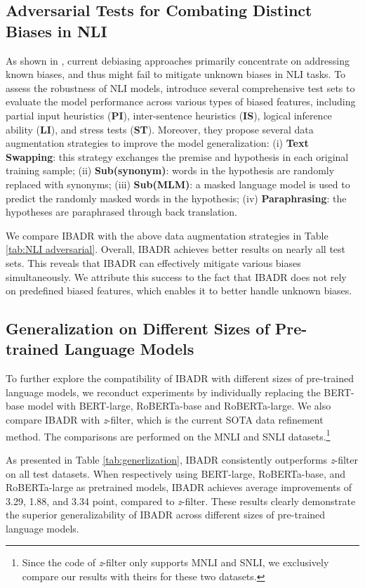 \documentclass[11pt]{article}
\def\model{\textsc{IBADR}\xspace}
\begin{document}
\subsection{Adversarial Tests for Combating Distinct Biases in NLI}
As shown in \cite{liu-etal-2020}, current debiasing approaches primarily concentrate on addressing known biases, and thus might fail to mitigate unknown biases in NLI tasks.  To assess the robustness of NLI models, \citet{liu-etal-2020} introduce several comprehensive test sets to evaluate the model performance across various types of biased features, including partial input heuristics (\textbf{PI}), inter-sentence heuristics (\textbf{IS}), logical inference ability (\textbf{LI}), and stress tests (\textbf{ST}). Moreover, they propose several data augmentation strategies to improve the model generalization:
(i) \textbf{Text Swapping}: this strategy exchanges the premise and hypothesis in each original training sample; (ii) \textbf{Sub(synonym)}: words in the hypothesis are randomly replaced with synonyms; (iii) \textbf{Sub(MLM)}: a masked language model is used to predict the randomly masked words in the hypothesis; (iv) \textbf{Paraphrasing}: the hypotheses are paraphrased through back translation.

We compare \model with the above data augmentation strategies in Table \ref{tab:NLI adversarial}. Overall, \model achieves better results on nearly all test sets. 
This reveals that \model can effectively mitigate various biases simultaneously. We attribute this success to the fact that \model does not rely on predefined biased features, which enables it to better handle unknown biases.



\subsection{Generalization on Different Sizes of Pre-trained Language Models}

To further explore the compatibility of \model with different sizes of pre-trained language models, we reconduct experiments by individually replacing the BERT-base model with BERT-large, RoBERTa-base and RoBERTa-large. We also compare \model with \textit{z}-filter, which is the current SOTA data refinement method. The comparisons are performed on the MNLI and SNLI datasets.\footnote{Since the code of \textit{z}-filter only supports MNLI and SNLI, we exclusively compare our results with theirs for these two datasets.}

As presented in Table \ref{tab:generlization}, \model consistently outperforms \textit{z}-filter on all test datasets. When respectively using BERT-large, RoBERTa-base, and RoBERTa-large as pretrained models, \model achieves average improvements of 3.29, 1.88, and 3.34 point, compared to \textit{z}-filter. These results clearly demonstrate the superior generalizability of \model across different sizes of pre-trained language models.
\end{document}

